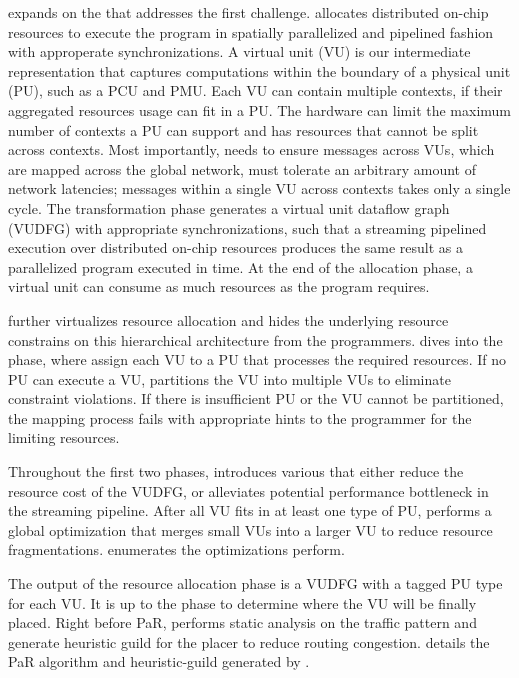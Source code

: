  expands on the  that
addresses the first challenge.
\name allocates distributed on-chip resources to execute the program in spatially parallelized and
pipelined fashion with approperate synchronizations.
A virtual unit (VU) is our intermediate representation that captures computations 
within the boundary of
a physical unit (PU), such as a PCU and PMU.
Each VU can contain multiple contexts, if their aggregated resources usage can fit in a PU.
The hardware can limit the maximum number of contexts a PU can support and has resources that cannot be split across contexts.
Most importantly, \name needs to ensure messages across VUs, which are mapped across the global network, must tolerate an arbitrary amount of network latencies; messages within a single VU across contexts takes only a single cycle.
The transformation phase generates a virtual unit dataflow graph (VUDFG) with appropriate
synchronizations, such that a streaming pipelined execution over distributed on-chip resources produces the same result as a
parallelized program executed in time.
At the end of the allocation phase, a virtual unit can consume as much resources as the program
requires. 

\name further virtualizes resource allocation and hides the underlying resource constrains on
this hierarchical architecture from the programmers.
 dives into the  phase, where \name assign each VU to a
PU that processes the required resources. If no PU can execute a VU, \name partitions the
VU into multiple VUs to eliminate constraint violations. If there is insufficient PU or the VU cannot be partitioned, the mapping process fails with appropriate hints to the programmer for the
limiting resources.

Throughout the first two phases, \name introduces various  that either reduce the
resource cost of the VUDFG, or alleviates potential performance bottleneck in the streaming
pipeline.
After all VU fits in at least one type of PU, \name performs a global optimization that merges small VUs into a larger VU to reduce resource fragmentations.
 enumerates the optimizations \name perform.

The output of the resource allocation phase is a VUDFG with a tagged PU type for each VU.
It is up to the
 phase to determine where the VU will be finally placed.
Right before PaR, \name performs static analysis on the traffic pattern and generate heuristic guild
for the placer to reduce routing congestion.
 details the PaR algorithm and heuristic-guild generated by \name.

